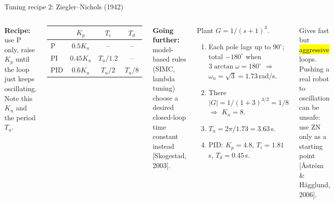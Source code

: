 \documentclass[aspectratio=169,10pt]{beamer}
\newcommand{\further}[1]{{\color{mkGray}\scriptsize\textbf{Going further:} #1}}
\begin{document}
\begin{frame}{Tuning recipe 2: Ziegler--Nichols (1942)}
\begin{columns}[T]
\small
\textbf{Recipe:} use P only, raise $K_p$ until the loop just keeps oscillating. Note this  $K_u$ and the period $T_u$.
\begin{center}
\footnotesize
\begin{tabular}{@{}lccc@{}}
\toprule
 & $K_p$ & $T_i$ & $T_d$\\
\midrule
P & $0.5K_u$ & -- & --\\
PI & $0.45K_u$ & $T_u/1.2$ & --\\
PID & $0.6K_u$ & $T_u/2$ & $T_u/8$\\
\bottomrule
\end{tabular}
\end{center}
\further{model-based rules (SIMC, lambda tuning) choose a desired closed-loop time constant instead [Skogestad, 2003].}
\begin{defbox}
\footnotesize
Plant $G=1/(s+1)^3$.
\begin{enumerate}
  \item Each pole lags up to $90^\circ$; total $-180^\circ$ when $3\arctan\omega=180^\circ$ $\Rightarrow$ $\omega_u=\sqrt3=1.73$\,rad/s.
  \item There $|G|=1/(1+3)^{3/2}=1/8$ $\Rightarrow$ $K_u=8$.
  \item $T_u=2\pi/1.73=3.63$\,s.
  \item PID: $K_p=4.8$, $T_i=1.81$\,s, $T_d=0.45$\,s.
\end{enumerate}
\end{defbox}
\begin{keybox}[Caution]
\footnotesize
Gives fast but \hl{aggressive} loops. Pushing a real robot to oscillation can be unsafe: use ZN only as a starting point [\AA str\"om \& H\"agglund, 2006].
\end{keybox}
\end{columns}
\end{frame}
\end{document}

